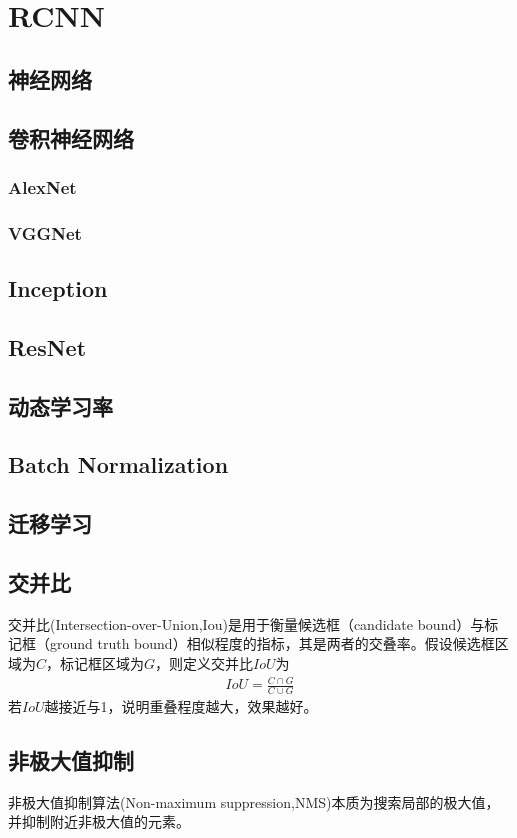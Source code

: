 \section{RCNN}
\subsection{神经网络}
\subsection{卷积神经网络}
\subsubsection{AlexNet}
\subsubsection{VGGNet}
\subsection{Inception}
\subsection{ResNet}
\subsection{动态学习率}
\subsection{Batch Normalization}
\subsection{迁移学习}
\subsection{交并比}
交并比(Intersection-over-Union,Iou)是用于衡量候选框（candidate bound）与标记框（ground truth bound）相似程度的指标，其是两者的交叠率。假设候选框区域为$C$，标记框区域为$G$，则定义交并比$IoU$为
\begin{eqnarray}
IoU=\frac{C\cap G}{C\cup G}
\end{eqnarray}
若$IoU$越接近与1，说明重叠程度越大，效果越好。
\subsection{非极大值抑制}
非极大值抑制算法(Non-maximum suppression,NMS)本质为搜索局部的极大值，并抑制附近非极大值的元素。

